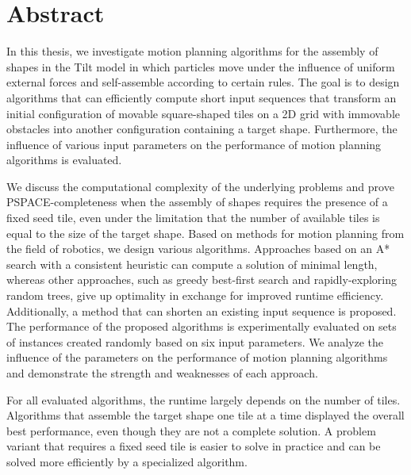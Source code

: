 \chapter*{Abstract}
In this thesis, we investigate motion planning algorithms for the assembly of shapes in the Tilt model in which particles move under the influence of uniform external forces and self-assemble according to certain rules. The goal is to design algorithms that can efficiently compute short input sequences that transform an initial configuration of movable square-shaped tiles on a 2D grid with immovable obstacles into another configuration containing a target shape. Furthermore, the influence of various input parameters on the performance of motion planning algorithms is evaluated.\par
\begin{sloppypar}
We discuss the computational complexity of the underlying problems and prove PSPACE-completeness when the assembly of shapes requires the presence of a fixed seed tile, even under the limitation that the number of available tiles is equal to the size of the target shape.
Based on methods for motion planning from the field of robotics, we design various algorithms. Approaches based on an A* search with a consistent heuristic can compute a solution of minimal length, whereas other approaches, such as greedy best-first search and rapidly-exploring random trees, give up optimality in exchange for improved runtime efficiency. Additionally, a method that can shorten an existing input sequence is proposed.
The performance of the proposed algorithms is experimentally evaluated on sets of instances created randomly based on six input parameters. We analyze the influence of the parameters on the performance of motion planning algorithms and demonstrate the strength and weaknesses of each approach.\par
 \end{sloppypar}
For all evaluated algorithms, the runtime largely depends on the number of tiles. Algorithms that assemble the target shape one tile at a time displayed the overall best performance, even though they are not a complete solution. A problem variant that requires a fixed seed tile is easier to solve in practice and can be solved more efficiently by a specialized algorithm.